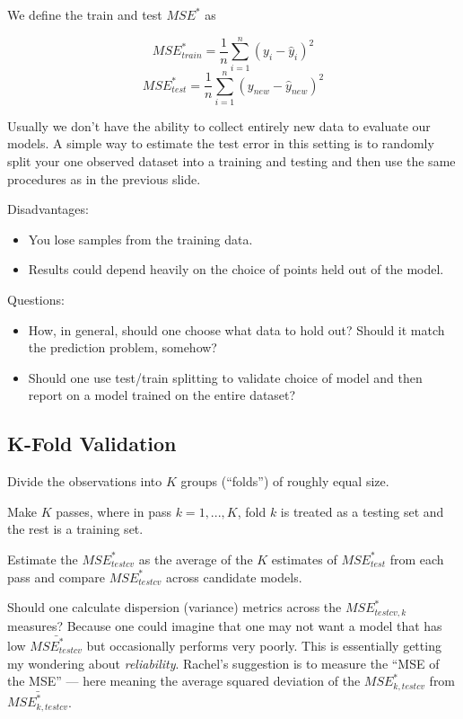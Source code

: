 \documentclass[
  letterpaper,
  DIV=11,
  numbers=noendperiod]{scrreport}
\providecommand{\tightlist}{%
  \setlength{\itemsep}{0pt}\setlength{\parskip}{0pt}}\usepackage{longtable,booktabs,array}
\begin{document}
We define the train and test \(MSE^*\) as

\[MSE_{train}^* = \frac{1}{n} \sum_{i=1}^n (y_i - \hat y_i)^2\]
\[MSE_{test}^* = \frac{1}{n} \sum_{i=1}^n (y_{new} - \hat y_{new})^2\]

Usually we don't have the ability to collect entirely new data to
evaluate our models. A simple way to estimate the test error in this
setting is to randomly split your one observed dataset into a training
and testing and then use the same procedures as in the previous slide.

Disadvantages:

\begin{itemize}
\tightlist
\item
  You lose samples from the training data.
\item
  Results could depend heavily on the choice of points held out of the
  model.
\end{itemize}

Questions:

\begin{itemize}
\tightlist
\item
  How, in general, should one choose what data to hold out? Should it
  match the prediction problem, somehow?
\item
  Should one use test/train splitting to validate choice of model and
  then report on a model trained on the entire dataset?
\end{itemize}

\hypertarget{k-fold-validation}{%
\subsection{K-Fold Validation}\label{k-fold-validation}}

Divide the observations into \(K\) groups (``folds'') of roughly equal
size.

Make \(K\) passes, where in pass \(k = 1, ..., K\), fold \(k\) is
treated as a testing set and the rest is a training set.

Estimate the \(MSE_{testcv}^*\) as the average of the \(K\) estimates of
\(MSE_{test}^*\) from each pass and compare \(MSE_{testcv}^*\) across
candidate models.

Should one calculate dispersion (variance) metrics across the
\(MSE_{testcv, k}^*\) measures? Because one could imagine that one may
not want a model that has low \(\bar{MSE_{testcv}^*}\) but occasionally
performs very poorly. This is essentially getting my wondering about
\emph{reliability}. Rachel's suggestion is to measure the ``MSE of the
MSE'' --- here meaning the average squared deviation of the
\(MSE^*_{k, testcv}\) from \(\bar{MSE_{k, testcv}^*}\).
\end{document}
